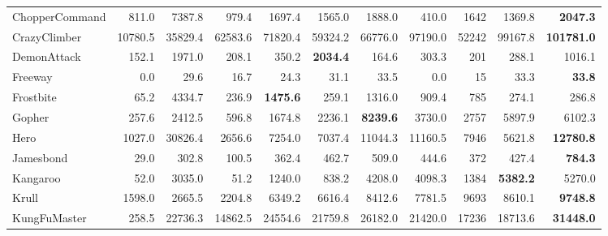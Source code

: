 \begin{table*}[ht!]
{\begin{tabular}{lrrrrrrrrrr}
ChopperCommand      &  811.0     &  7387.8    &  979.4     &  1697.4             &  1565.0            &  1888.0             &  410.0       &  1642     &  1369.8            &  \textbf{2047.3}     \\
CrazyClimber        &  10780.5   &  35829.4   &  62583.6   &  71820.4            &  59324.2           &  66776.0            &  97190.0     &  52242    &  99167.8           &  \textbf{101781.0}   \\
DemonAttack         &  152.1     &  1971.0    &  208.1     &  350.2              &  \textbf{2034.4}   &  164.6              &  303.3       &  201      &  288.1             &  1016.1              \\
Freeway             &  0.0       &  29.6      &  16.7      &  24.3               &  31.1              &  33.5               &  0.0         &  15       &  33.3              &  \textbf{33.8}       \\
Frostbite           &  65.2      &  4334.7    &  236.9     &  \textbf{1475.6}    &  259.1             &  1316.0             &  909.4       &  785      &  274.1             &  286.8               \\
Gopher              &  257.6     &  2412.5    &  596.8     &  1674.8             &  2236.1            &  \textbf{8239.6}    &  3730.0      &  2757     &  5897.9            &  6102.3              \\
Hero                &  1027.0    &  30826.4   &  2656.6    &  7254.0             &  7037.4            &  11044.3            &  11160.5     &  7946     &  5621.8            &  \textbf{12780.8}    \\
Jamesbond           &  29.0      &  302.8     &  100.5     &  362.4              &  462.7             &  509.0              &  444.6       &  372      &  427.4             &  \textbf{784.3}      \\
Kangaroo            &  52.0      &  3035.0    &  51.2      &  1240.0             &  838.2             &  4208.0             &  4098.3      &  1384     &  \textbf{5382.2}   &  5270.0              \\
Krull               &  1598.0    &  2665.5    &  2204.8    &  6349.2             &  6616.4            &  8412.6             &  7781.5      &  9693     &  8610.1            &  \textbf{9748.8}     \\
KungFuMaster        &  258.5     &  22736.3   &  14862.5   &  24554.6            &  21759.8           &  26182.0            &  21420.0     &  17236    &  18713.6           &  \textbf{31448.0}    \\

\end{tabular}}
\end{table*}
